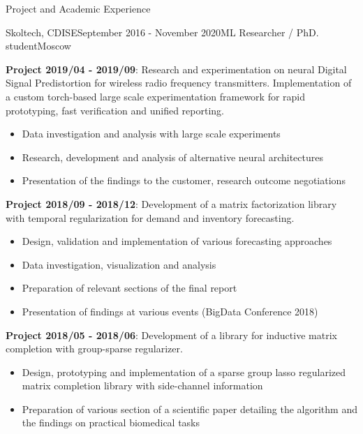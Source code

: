 \documentclass{resume} %
\begin{document}
\begin{rSection}{Project and Academic Experience}
\begin{rSubsection}{Skoltech, CDISE}{September 2016 - November 2020}{ML Researcher / PhD. student}{Moscow}
    \medskip
    \item \textbf{Project 2019/04 - 2019/09}:
    Research and experimentation on neural Digital Signal Predistortion for wireless radio
    frequency transmitters. Implementation of a custom torch-based large scale experimentation framework
    for rapid prototyping, fast verification and unified reporting. \begin{itemize}
        \item Data investigation and analysis with large scale experiments
        
        \item Research, development and analysis of alternative neural architectures
        
        \item Presentation of the findings to the customer, research outcome negotiations
    \end{itemize}

    \medskip
    \item \textbf{Project 2018/09 - 2018/12}:
    Development of a matrix factorization library with temporal regularization for demand
    and inventory forecasting. \begin{itemize}
        \item Design, validation and implementation of various forecasting approaches
        
        \item Data investigation, visualization and analysis
        
        \item Preparation of relevant sections of the final report
        
        \item Presentation of findings at various events (BigData Conference 2018)
    \end{itemize}

    \medskip
    \item \textbf{Project 2018/05 - 2018/06}:
    Development of a library for inductive matrix completion with group-sparse regularizer.
    \begin{itemize}
        \item Design, prototyping and implementation of a sparse group lasso regularized
        matrix completion library with side-channel information
        
        \item Preparation of various section of a scientific paper detailing the algorithm
        and the findings on practical biomedical tasks
        

\end{itemize}
\end{rSubsection}
\end{rSection}
\end{document}
